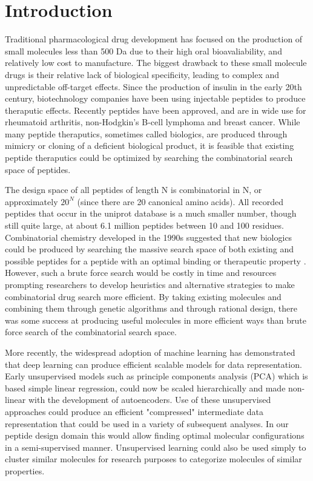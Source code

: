 \documentclass[final,1p,times]{elsarticle}
\begin{document}
\linenumbers

\section{Introduction}

Traditional pharmacological drug development has focused on the production of small molecules less than 500 Da due to their high oral bioavaliability, and relatively low cost to manufacture. The biggest drawback to these small molecule drugs is their relative lack of biological specificity, leading to complex and unpredictable off-target effects. Since the production of insulin in the early 20th century, biotechnology companies have been using injectable peptides to produce theraputic effects\cite{weyer1999natural}. Recently peptides have been approved, and are in wide use for rheumatoid arthritis, non-Hodgkin’s B-cell lymphoma and breast cancer\cite{craik2013future}. While many peptide theraputics, sometimes called biologics, are produced through mimicry or cloning of a deficient biological product, it is feasible that existing peptide theraputics could be optimized by searching the combinatorial search space of peptides.

The design space of all peptides of length N is combinatorial in N, or approximately $20^N$ (since there are 20 canonical amino acids). All recorded peptides that occur in the uniprot database is a much smaller number, though still quite large, at about 6.1 million peptides between 10 and 100 residues. Combinatorial chemistry developed in the 1990s suggested that new biologics could be produced by searching the massive search space of both existing and possible peptides for a peptide with an optimal binding or therapeutic property \cite{youngquist1995generation}. However, such a brute force search would be costly in time and resources prompting researchers to develop heuristics and alternative strategies to make combinatorial drug search more efficient\cite{feher2003property}. By taking existing molecules and combining them through genetic algorithms and through rational design, there was some success at producing useful molecules in more efficient ways than brute force search of the combinatorial search space\cite{belda2005enpda}.

More recently, the widespread adoption of machine learning has demonstrated that deep learning can produce efficient scalable models for data representation. Early unsupervised models such as principle components analysis (PCA) which is based simple linear regression, could now be scaled hierarchically and made non-linear with the development of autoencoders\cite{hinton1994autoencoders}. Use of these unsupervised approaches could produce an efficient "compressed" intermediate data representation that could be used in a variety of subsequent analyses. In our peptide design domain this would allow finding optimal molecular configurations in a semi-supervised manner. Unsupervised learning could also be used simply to cluster similar molecules for research purposes to categorize molecules of similar properties.
\end{document}
